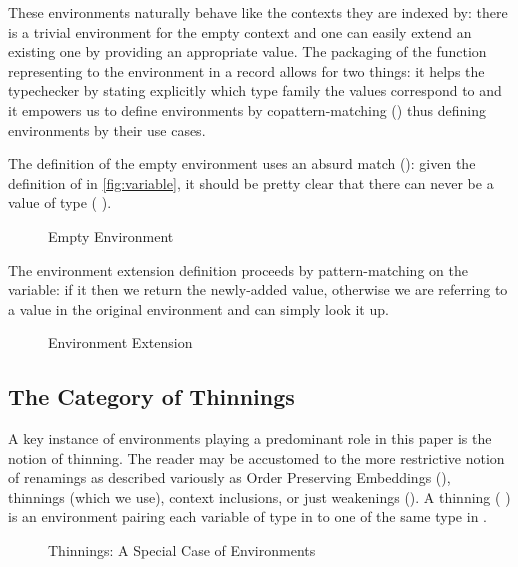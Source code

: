 These environments naturally behave like the contexts they are indexed by:
there is a trivial environment for the empty context and one can easily
extend an existing one by providing an appropriate value. The packaging of
the function representing to the environment in a record allows for two
things: it helps the typechecker by stating explicitly which type family
the values correspond to and it empowers us to define environments by
copattern-matching (\cite{abel2013copatterns}) thus defining environments
by their use cases.

\label{fig:envcombinators}

The definition of the empty environment uses an absurd match (\AS{()}): given
the definition of  in \cref{fig:variable}, it should be pretty clear
that there can never be a value of type ({  \AIC{[]}}).

\begin{figure}[h]
\caption{Empty Environment\label{fig:emptyenv}}
\end{figure}

The environment extension definition proceeds by pattern-matching on the
variable: if it  then we return the newly-added value, otherwise we are
referring to a value in the original environment and can simply look it up.

\begin{figure}[h]
\caption{Environment Extension\label{fig:envextend}}
\end{figure}

\subsection{The Category of Thinnings}
\label{sec:categoryrenamings}

A key instance of environments playing a predominant role in this paper is the
notion of thinning. The reader may be accustomed to the more restrictive notion
of renamings as described variously as Order Preserving Embeddings
(\cite{chapman2009type}), thinnings (which we use), context inclusions,
or just weakenings (\cite{altenkirch1995categorical}). A thinning
(  ) is an environment pairing each variable
of type  in  to one of the same type in .

\begin{figure}[h]
\caption{Thinnings: A Special Case of Environments\label{fig:thinnings}}
\end{figure}

